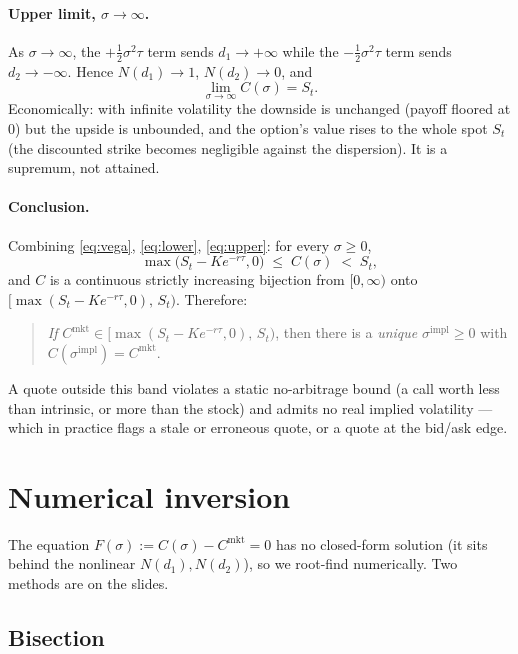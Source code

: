 \documentclass[11pt]{article}
\newcommand{\impl}{\mathrm{impl}}
\newcommand{\mkt}{\mathrm{mkt}}
\begin{document}
\paragraph{Upper limit, $\sigma\to\infty$.} As $\sigma\to\infty$, the $+\tfrac12\sigma^2\tau$ term
sends $d_1\to+\infty$ while the $-\tfrac12\sigma^2\tau$ term sends $d_2\to-\infty$. Hence
$N(d_1)\to1$, $N(d_2)\to0$, and
\begin{equation}\label{eq:upper}
\lim_{\sigma\to\infty}C(\sigma)=S_t.
\end{equation}
Economically: with infinite volatility the downside is unchanged (payoff floored at $0$) but the
upside is unbounded, and the option's value rises to the whole spot $S_t$ (the discounted strike
becomes negligible against the dispersion). It is a supremum, not attained.

\paragraph{Conclusion.} Combining \eqref{eq:vega}, \eqref{eq:lower}, \eqref{eq:upper}: for every
$\sigma\ge0$,
\begin{equation}\label{eq:bounds}
\max\!\big(S_t-Ke^{-r\tau},0\big)\;\le\;C(\sigma)\;<\;S_t,
\end{equation}
and $C$ is a continuous strictly increasing bijection from $[0,\infty)$ onto
$\big[\max(S_t-Ke^{-r\tau},0),\,S_t\big)$. Therefore:
\begin{quote}
\emph{If} $C^{\mkt}\in\big[\max(S_t-Ke^{-r\tau},0),\,S_t\big)$, then there is a \emph{unique}
$\sigma^{\impl}\ge0$ with $C(\sigma^{\impl})=C^{\mkt}$.
\end{quote}
A quote outside this band violates a static no-arbitrage bound (a call worth less than intrinsic,
or more than the stock) and admits no real implied volatility --- which in practice flags a stale
or erroneous quote, or a quote at the bid/ask edge.

\section{Numerical inversion}

The equation $F(\sigma):=C(\sigma)-C^{\mkt}=0$ has no closed-form solution (it sits behind the
nonlinear $N(d_1),N(d_2)$), so we root-find numerically. Two methods are on the slides.

\subsection{Bisection}
\end{document}
